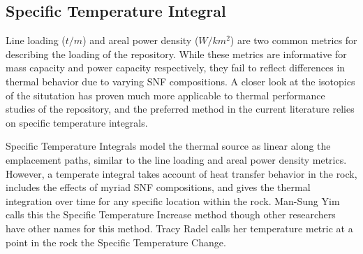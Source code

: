 {%
%

 


\subsection{Specific Temperature Integral}

Line loading ($t/m$) and areal power density ($W/km^2$) are two common metrics
for describing the loading of the repository. While these metrics are
informative for mass capacity and power capacity respectively, they fail to
reflect differences in thermal behavior due to varying SNF compositions.  A
closer look at the isotopics of the situtation has proven much more applicable
to thermal performance studies of the repository, and the preferred method in
the current literature relies on specific temperature integrals.


Specific Temperature Integrals model the thermal source as linear along the
emplacement paths, similar to the line loading and areal power density metrics.
However, a temperate integral takes account of heat transfer behavior in the
rock, includes the effects of myriad SNF compositions, and gives the thermal
integration over time for any specific location within the rock.  Man-Sung Yim
calls this the Specific Temperature Increase method\cite{li_specific_2008}
though other researchers have other names for this method. Tracy Radel calls
her temperature metric at a point in the rock the Specific Temperature
Change\cite{radel_repository_2007}.

}
